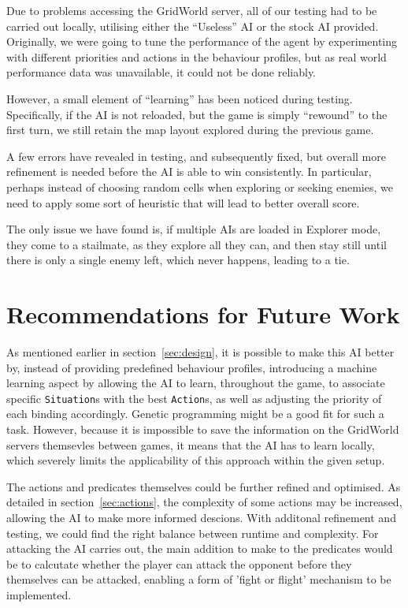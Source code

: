 \documentclass[11pt]{article}
\begin{document}
Due to problems accessing the GridWorld server, all of our testing had to be carried out locally, utilising either the ``Useless'' AI or the stock AI provided. Originally, we were going to tune the performance of the agent by experimenting with different priorities and actions in the behaviour profiles, but as real world performance data was unavailable, it could not be done reliably.

However, a small element of ``learning'' has been noticed during testing. Specifically, if the AI is not reloaded, but the game is simply ``rewound'' to the first turn, we still retain the map layout explored during the previous game.

A few errors have revealed in testing, and subsequently fixed, but overall more refinement is needed before the AI is able to win consistently. In particular, perhaps instead of choosing random cells when exploring or seeking enemies, we need to apply some sort of heuristic that will lead to better overall score.

The only issue we have found is, if multiple AIs are loaded in Explorer mode, they come to a stailmate, as they explore all they can, and then stay still until there is only a single enemy left, which never happens, leading to a tie.

\section{Recommendations for Future Work} \label{sec:futureWork}

As mentioned earlier in section~\ref{sec:design}, it is possible to make this AI better by, instead of providing predefined behaviour profiles, introducing a machine learning aspect by allowing the AI to learn, throughout the game, to associate specific \verb|Situation|s with the best \verb|Action|s, as well as adjusting the priority of each binding accordingly. Genetic programming might be a good fit for such a task. However, because it is impossible to save the information on the GridWorld servers themsevles between games, it means that the AI has to learn locally, which severely limits the applicability of this approach within the given setup.

The actions and predicates themselves could be further refined and optimised. As detailed in section~\ref{sec:actions}, the complexity of some actions may be increased, allowing the AI to make more informed descions. With additonal refinement and testing, we could find the right balance between runtime and complexity.  For  attacking the AI carries out, the main addition to make to the predicates would be to calcutate whether the player can attack the opponent before they themselves can be attacked, enabling a form of 'fight or flight' mechanism to be implemented.
\end{document}
